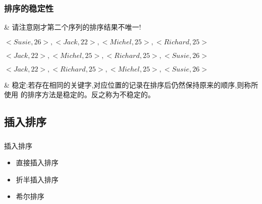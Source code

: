 \begin{frame}[fragile]
  \frametitle{排序的稳定性}
  \begin{easylist} \easyitem

    & 请注意刚才第二个序列的排序结果不唯一!

    $<Susie,26>, <Jack,22>, <Michel,25>, <Richard,25>$

    \color{red} $<Jack,22>,<Michel,25>, <Richard, 25>, <Susie,26>$

    \color{blue} $<Jack,22>, <Richard, 25>, <Michel,25>, <Susie,26>$
    
    & 稳定:若存在相同的关键字,对应位置的记录在排序后仍然保持原来的顺序,则称所使用
    的排序方法是稳定的。反之称为不稳定的。

  \end{easylist}
\end{frame}

\subsection{插入排序}
\begin{frame}[fragile]
  \frametitle{}
  \begin{sectionbox}{插入排序}
    \begin{itemize}
    \item 直接插入排序
    \item 折半插入排序
    \item 希尔排序
    \end{itemize}
  \end{sectionbox}
\end{frame}

